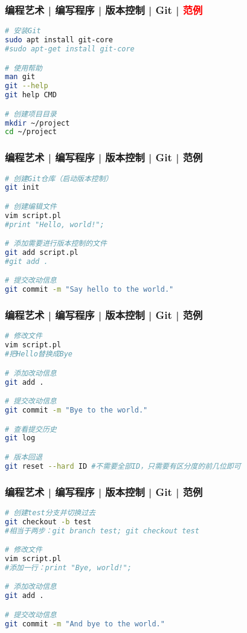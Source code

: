\begin{frame}[fragile]
  \frametitle{编程艺术 | 编写程序 | 版本控制 | Git | \textcolor{red}{范例}}
\begin{lstlisting}[language=sh]
# 安装Git
sudo apt install git-core
#sudo apt-get install git-core

# 使用帮助
man git
git --help
git help CMD

# 创建项目目录
mkdir ~/project
cd ~/project
\end{lstlisting}
\end{frame}

\begin{frame}[fragile]
  \frametitle{编程艺术 | 编写程序 | 版本控制 | Git | \alert{范例}}
\begin{lstlisting}[language=sh]
# 创建Git仓库（启动版本控制）
git init

# 创建编辑文件
vim script.pl
#print "Hello, world!";

# 添加需要进行版本控制的文件
git add script.pl
#git add .

# 提交改动信息
git commit -m "Say hello to the world."
\end{lstlisting}
\end{frame}

\begin{frame}[fragile]
  \frametitle{编程艺术 | 编写程序 | 版本控制 | Git | 范例}
\begin{lstlisting}[language=sh]
# 修改文件
vim script.pl
#把Hello替换成Bye

# 添加改动信息
git add .

# 提交改动信息
git commit -m "Bye to the world."

# 查看提交历史
git log

# 版本回退
git reset --hard ID #不需要全部ID，只需要有区分度的前几位即可
\end{lstlisting}
\end{frame}

\begin{frame}[fragile]
  \frametitle{编程艺术 | 编写程序 | 版本控制 | Git | 范例}
\begin{lstlisting}[language=sh]
# 创建test分支并切换过去
git checkout -b test
#相当于两步：git branch test; git checkout test

# 修改文件
vim script.pl
#添加一行：print "Bye, world!";

# 添加改动信息
git add .

# 提交改动信息
git commit -m "And bye to the world."
\end{lstlisting}
\end{frame}

